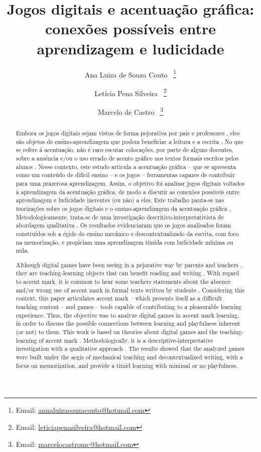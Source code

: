 \documentclass{textolivre}
\title{Jogos digitais e acentuação gráfica: conexões possíveis entre aprendizagem e ludicidade}
\author[1]{Ana Luiza de Souza Couto~\orcid{0000-0002-6389-7818} \thanks{Email: \url{annaluizasouzacouto@hotmail.com}}}
\author[1]{Letícia Pena Silveira~\orcid{0000-0003-1194-3437} \thanks{Email: \url{leticiapenasilveira@hotmail.com}}}
\author[1]{Marcelo de Castro~\orcid{0000-0002-1056-1288} \thanks{Email: \url{marcelocastromc@hotmail.com}}}
\affil[1]{Universidade Federal de Minas Gerais, Faculdade de Letras, Belo Horizonte, MG, Brasil.}
\begin{document}
\maketitle

\begin{polyabstract}
\begin{abstract}
Embora os jogos digitais sejam vistos de forma pejorativa por pais e professores \cite{leffa2012}, eles são objetos de ensino-aprendizagem que podem beneficiar a leitura e a escrita \cite{ribeiro2016}. No que se refere à acentuação, não é raro escutar colocações, por parte de alguns docentes, sobre a ausência e/ou o uso errado de acento gráfico nos textos formais escritos pelos alunos \cite{couto+guimaraes2020}. Nesse contexto, este estudo articula a acentuação gráfica – que se apresenta como um conteúdo de difícil ensino – e os jogos – ferramentas capazes de contribuir para uma prazerosa aprendizagem. Assim, o objetivo foi analisar jogos digitais voltados à aprendizagem da acentuação gráfica, de modo a discutir as conexões possíveis entre aprendizagem e ludicidade inerentes (ou não) a eles. Este trabalho pauta-se nas teorizações sobre os jogos digitais \cite{leffa2012, ribeiro2013, ribeiro2016} e o ensino-aprendizagem da acentuação gráfica \cite{marra2012, couto+guimaraes2020, cristofaro2020}. Metodologicamente, trata-se de uma investigação descritivo-interpretativista de abordagem qualitativa \cite{paiva2019}. Os resultados evidenciaram que os jogos analisados foram construídos sob a égide do ensino mecânico e descontextualizado da escrita, com foco na memorização, e propiciam uma aprendizagem tímida com ludicidade mínima ou nula.

\end{abstract}

\begin{english}
\begin{abstract}
Although digital games have been seeing in a pejorative way by parents and teachers \cite{leffa2012}, they are teaching-learning objects that can benefit reading and writing \cite{ribeiro2016}. With regard to accent mark, it is common to hear some teachers statements about the absence and/or wrong use of accent mark in formal texts written by students \cite{couto+guimaraes2020}. Considering this context, this paper articulates accent mark – which presents itself as a difficult teaching content – and games – tools capable of contributing to a pleasurable learning experience. Thus, the objective was to analyze digital games in accent mark learning, in order to discuss the possible connections between learning and playfulness inherent (or not) to them. This work is based on theories about digital games \cite{leffa2012, ribeiro2013, ribeiro2016} and the teaching-learning of accent mark \cite{marra2012, couto+guimaraes2020, cristofaro2020}. Methodologically, it is a descriptive-interpretative investigation with a qualitative approach \cite{paiva2019}. The results showed that the analyzed games were built under the aegis of mechanical teaching and decontextualized writing, with a focus on memorization, and provide a timid learning with minimal or no playfulness.


\end{abstract}
\end{english}
\end{polyabstract}
\end{document}
